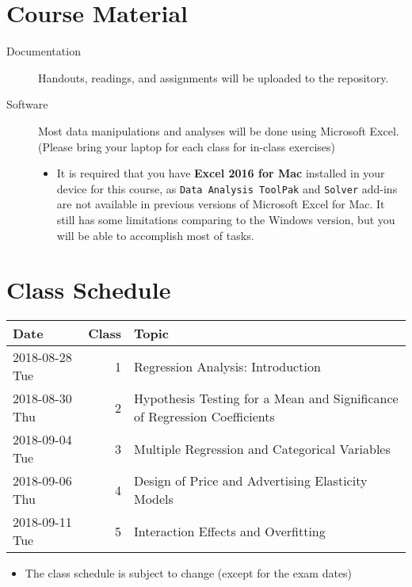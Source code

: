 \documentclass[article,letterpaper,times,10pt,listings-bw,microtype]{scrartcl}
\begin{document}
\section*{Course Material}
\label{sec:org61232c9}
\begin{description}
\item[{Documentation}] Handouts, readings, and assignments will be uploaded to
the repository.
\item[{Software}] Most data manipulations and analyses will be done using
Microsoft Excel. (Please bring your laptop for each class for
in-class exercises)

\begin{mdframed}[style=exampledefault, frametitle={Note for Mac users}]
\begin{itemize}
\item It is required that you have \textbf{Excel 2016 for Mac} installed in your
device for this course, as \texttt{Data Analysis ToolPak} and \texttt{Solver}
add-ins are not available in previous versions of Microsoft Excel for
Mac. It still has some limitations comparing to the Windows version,
but you will be able to accomplish most of tasks.
\end{itemize}
\end{mdframed}
\iffalse
\begin{itemize}
\item Mac Users: please install \textbf{Excel 2016 for Mac}
\end{itemize}
\fi
\end{description}
\clearpage
\section*{Class Schedule}
\label{sec:org3708993}
\begin{center}
\begin{tabular}{lrl}
Date & Class & Topic\\
\hline
2018-08-28 Tue & 1 & Regression Analysis: Introduction\\
2018-08-30 Thu & 2 & Hypothesis Testing for a Mean and Significance of Regression Coefficients\\
2018-09-04 Tue & 3 & Multiple Regression and Categorical Variables\\
2018-09-06 Thu & 4 & Design of Price and Advertising Elasticity Models\\
2018-09-11 Tue & 5 & Interaction Effects and Overfitting\\
\end{tabular}
\end{center}

\begin{mdframed}[style=exampledefault, frametitle={Disclaimer}]
\begin{itemize}
\item The class schedule is subject to change (except for the exam dates)
\end{itemize}
\end{mdframed}
\end{document}
